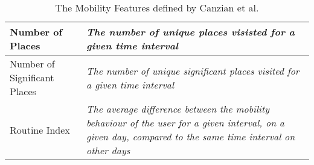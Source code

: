 \begin{table}[h]
\begin{tabular}{|p{}|p{}|}
Number of Places             & \textit{The number of unique places visisted for a given time interval}                                                                                           \\ \hline
Number of Significant Places & \textit{The number of unique significant places visited for a given time interval}                                                                                \\ \hline
Routine Index                & \textit{The average difference between the mobility behaviour of the user for a given interval, on a given day, compared to the same time interval on other days} \\ \hline
\end{tabular}
    \caption{The Mobility Features defined by Canzian et al. \cite{Canzian2015}}
    \label{tab:canzian-features}
\end{table}